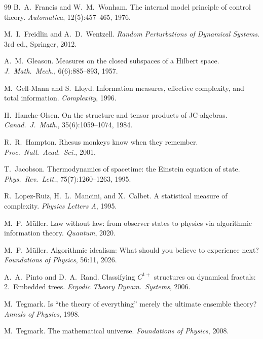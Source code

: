 \documentclass[12pt]{article}
\theoremstyle{remark}
\begin{document}
\begin{thebibliography}{99}
B.~A.~Francis and W.~M.~Wonham.
\newblock The internal model principle of control theory.
\newblock \emph{Automatica}, 12(5):457--465, 1976.

M.~I.~Freidlin and A.~D.~Wentzell.
\newblock \emph{Random Perturbations of Dynamical Systems}.
\newblock 3rd ed., Springer, 2012.

A.~M.~Gleason.
\newblock Measures on the closed subspaces of a {H}ilbert space.
\newblock \emph{J.~Math.\ Mech.}, 6(6):885--893, 1957.

M.~Gell-Mann and S.~Lloyd.
\newblock Information measures, effective complexity, and total information.
\newblock \emph{Complexity}, 1996.

H.~Hanche-Olsen.
\newblock On the structure and tensor products of {JC}-algebras.
\newblock \emph{Canad.\ J.\ Math.}, 35(6):1059--1074, 1984.

R.~R.~Hampton.
\newblock Rhesus monkeys know when they remember.
\newblock \emph{Proc.\ Natl.\ Acad.\ Sci.}, 2001.

T.~Jacobson.
\newblock Thermodynamics of spacetime: the {E}instein equation of state.
\newblock \emph{Phys.\ Rev.\ Lett.}, 75(7):1260--1263, 1995.

R.~Lopez-Ruiz, H.~L.~Mancini, and X.~Calbet.
\newblock A statistical measure of complexity.
\newblock \emph{Physics Letters A}, 1995.

M.~P.~M\"uller.
\newblock Law without law: from observer states to physics via algorithmic information theory.
\newblock \emph{Quantum}, 2020.

M.~P.~M\"uller.
\newblock Algorithmic idealism: What should you believe to experience next?
\newblock \emph{Foundations of Physics}, 56:11, 2026.

A.~A.~Pinto and D.~A.~Rand.
\newblock Classifying $C^{1+}$ structures on dynamical fractals: 2.\ Embedded trees.
\newblock \emph{Ergodic Theory Dynam.\ Systems}, 2006.

M.~Tegmark.
\newblock Is ``the theory of everything'' merely the ultimate ensemble theory?
\newblock \emph{Annals of Physics}, 1998.

M.~Tegmark.
\newblock The mathematical universe.
\newblock \emph{Foundations of Physics}, 2008.


\end{thebibliography}
\end{document}
